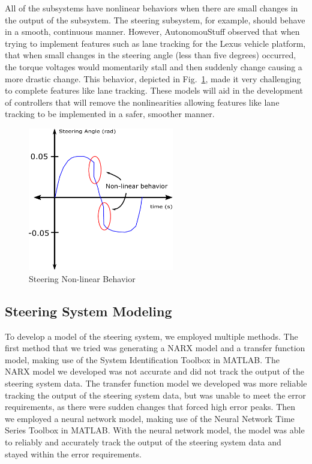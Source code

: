 \documentclass[journal,twoside,web]{ieeecolor}
\begin{document}
All of the subsystems have nonlinear behaviors when there are small changes in the output of the subsystem. The steering subsystem, for example, should behave in a smooth, continuous manner. However, AutonomouStuff observed that when trying to implement features such as lane tracking for the Lexus vehicle platform, that when small changes in the steering angle (less than five degrees) occurred, the torque voltages would momentarily stall and then suddenly change causing a more drastic change. This behavior, depicted in Fig.~\ref{fig:nonlinGraph}, made it very challenging to complete features like lane tracking. These models will aid in the development of controllers that will remove the nonlinearities allowing features like lane tracking to be implemented in a safer, smoother manner. 

\begin{figure}[htbp]
    \centering
    \captionsetup{justification=centering}
    \includegraphics[width=2.5in]{figs/inkscape/nonlinearBehavior}
    \caption{Steering Non-linear Behavior}
    \label{fig:nonlinGraph}
\end{figure}

\subsection{Steering System Modeling}
To develop a model of the steering system, we employed multiple methods. The first method that we tried was generating a NARX model and a transfer function model, making use of the System Identification Toolbox in MATLAB. The NARX model we developed was not accurate and did not track the output of the steering system data. The transfer function model we developed was more reliable tracking the output of the steering system data, but was unable to meet the error requirements, as there were sudden changes that forced high error peaks. Then we employed a neural network model, making use of the Neural Network Time Series Toolbox in MATLAB. With the neural network model, the model was able to reliably and accurately track the output of the steering system data and stayed within the error requirements. 
\end{document}
